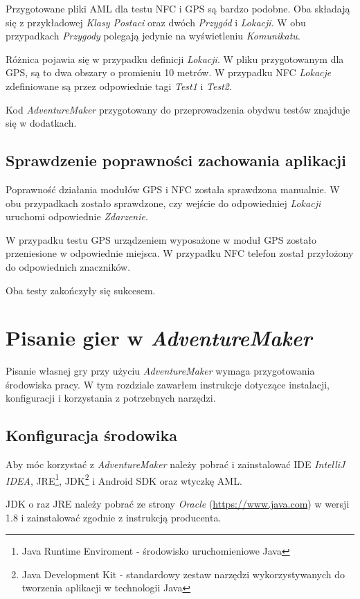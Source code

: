 \documentclass[openright]{xmgr}
\begin{document}
Przygotowane pliki AML dla testu NFC i GPS są bardzo podobne. Oba składają się z przykładowej \textit{Klasy Postaci} oraz dwóch \textit{Przygód} i \textit{Lokacji}. W obu przypadkach \textit{Przygody} polegają jedynie na wyświetleniu \textit{Komunikatu}. 

Różnica pojawia się w przypadku definicji \textit{Lokacji}. W pliku przygotowanym dla GPS, są to dwa obszary o promieniu 10 metrów. W przypadku NFC \textit{Lokacje} zdefiniowane są przez odpowiednie tagi \textit{Test1} i \textit{Test2}.

Kod \textit{AdventureMaker} przygotowany do przeprowadzenia obydwu testów znajduje się w dodatkach.

\section{Sprawdzenie poprawności zachowania aplikacji}

Poprawność działania modułów GPS i NFC została sprawdzona manualnie. W obu przypadkach zostało sprawdzone, czy wejście do odpowiedniej \textit{Lokacji} uruchomi odpowiednie \textit{Zdarzenie}.

W przypadku testu GPS urządzeniem wyposażone w moduł GPS zostało przeniesione w odpowiednie miejsca. W przypadku NFC telefon został przyłożony do odpowiednich znaczników. 

Oba testy zakończyły się sukcesem.  

\chapter{Pisanie gier w \textit{AdventureMaker}}
Pisanie własnej gry przy użyciu \textit{AdventureMaker} wymaga przygotowania środowiska pracy. W tym rozdziale zawarłem instrukcje dotyczące instalacji, konfiguracji i korzystania z potrzebnych narzędzi. 

\section{Konfiguracja środowika}

Aby móc korzystać z \textit{AdventureMaker} należy pobrać i zainstalować IDE \textit{IntelliJ IDEA}, JRE\footnote{Java Runtime Enviroment - środowisko uruchomieniowe Java}, JDK\footnote{Java Development Kit - standardowy zestaw narzędzi wykorzystywanych do tworzenia aplikacji w technologii Java} i Android SDK oraz wtyczkę AML.

JDK o raz JRE należy pobrać ze strony \textit{Oracle} (\url{https://www.java.com}) w wersji 1.8 i zainstalować zgodnie z instrukcją producenta.
\end{document}
